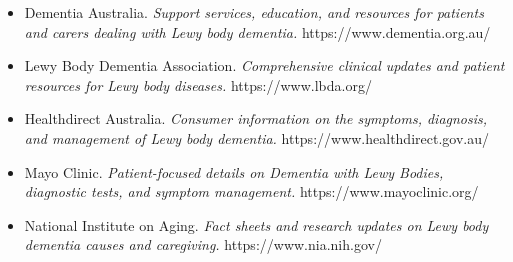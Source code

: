 \begin{itemize}
    \item Dementia Australia. \textit{Support services, education, and resources for patients and carers dealing with Lewy body dementia.} https://www.dementia.org.au/
    \item Lewy Body Dementia Association. \textit{Comprehensive clinical updates and patient resources for Lewy body diseases.} https://www.lbda.org/
    \item Healthdirect Australia. \textit{Consumer information on the symptoms, diagnosis, and management of Lewy body dementia.} https://www.healthdirect.gov.au/
    \item Mayo Clinic. \textit{Patient-focused details on Dementia with Lewy Bodies, diagnostic tests, and symptom management.} https://www.mayoclinic.org/
    \item National Institute on Aging. \textit{Fact sheets and research updates on Lewy body dementia causes and caregiving.} https://www.nia.nih.gov/
\end{itemize}
